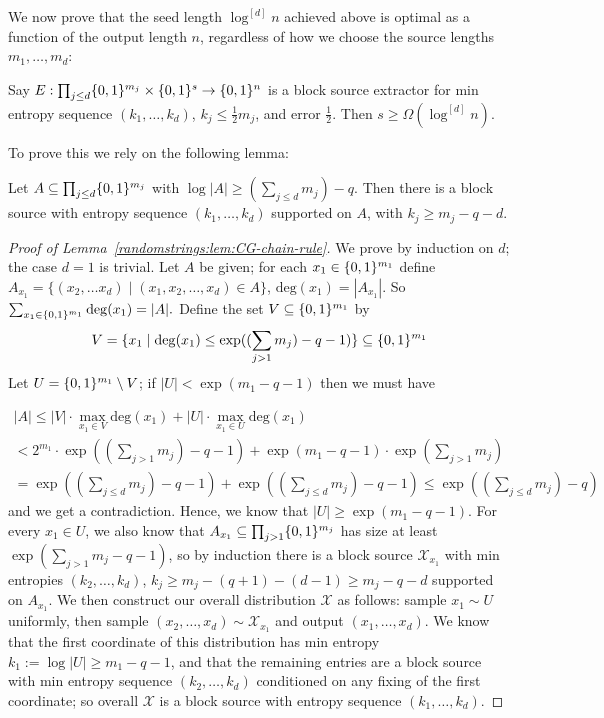 We now prove that the seed length $\log^{[d]}n$ achieved above is optimal as a function of the output length $n$, regardless of how we choose the source lengths $m_1,\ldots,m_d$:
\begin{theorem}\label{randomstrings:thm:seed-length-lb}
Say $E: \prod_{j \leq d} \{0,1\}^{m_j} \times \{0,1\}^s \to \{0,1\}^n$ is a block source extractor for min entropy sequence $(k_1,\ldots,k_d)$, $k_j \leq \frac{1}{2} m_j$, and error $\frac{1}{2}$. Then $s \geq \Omega(\log^{[d]}n)$. 
\end{theorem}

To prove this we rely on the following lemma:
\begin{lemma}\label{randomstrings:lem:CG-chain-rule}
Let $A \subseteq \prod_{j \leq d} \{0,1\}^{m_j}$ with $\log|A|\geq (\sum_{j\leq d}m_j) - q$. Then there is a block source with entropy sequence $(k_1,\ldots,k_d)$ supported on $A$, with $k_j \geq m_j - q - d$.
\end{lemma}
\begin{proof}[Proof of Lemma~\ref{randomstrings:lem:CG-chain-rule}]
We prove by induction on $d$; the case $d=1$ is trivial. Let $A$ be given; for each $x_1 \in \{0,1\}^{m_1}$ define $A_{x_1} = \{(x_2,\ldots x_d) \mid (x_1,x_2,\ldots,x_d) \in A\}$, $\mathrm{deg}(x_1) = |A_{x_1}| $. So $\sum_{x_1 \in \{0,1\}^{m_1}} \deg(x_1) = |A|.$
Define the set $V \subseteq \{0,1\}^{m_1}$ by 
\[
V = \{x_1 \mid \mathrm{deg}(x_1) \leq  \exp((\sum_{j>1} m_j) - q- 1) \} \subseteq \{0,1\}^{m_1}
\]
Let $U = \{0,1\}^{m_1} \setminus V$; if $|U| < \exp( m_1-q-1)$ then we must have

\begin{gather}
|A| \leq |V| \cdot \max_{x_1 \in V} \mathrm{deg}(x_1) + |U| \cdot \max_{x_1 \in U} \mathrm{deg}(x_1) \\
<  2^{m_1} \cdot \exp((\sum_{j>1} m_j) - q-1) + \exp(m_1-q-1) \cdot  \exp(\sum_{j > 1} m_j)\\
= \exp((\sum_{j \leq d}
 m_j) - q-1) + \exp((\sum_{j \leq d} m_j) - q-1) \leq \exp((\sum_{j \leq d} m_j)- q)
 \end{gather}
and we get a contradiction. Hence, we know that $|U| \geq \exp(m_1 - q - 1)$. For every $x_1 \in U$, we also know that $A_{x_1} \subseteq \prod_{j > 1} \{0,1\}^{m_j}$ has size at least $\exp(\sum_{j>1} m_j - q-1)$, so by induction there is a block source $\mathcal{X}_{x_1}$ with min entropies $(k_2,\ldots,k_d)$, $k_j \geq m_j - (q+1) - (d-1) \geq m_j - q - d $ supported on $A_{x_1}$. We then construct our overall distribution $\mathcal{X}$ as follows: sample $x_1 \sim U$ uniformly, then sample $(x_2,\ldots,x_d) \sim \mathcal{X}_{x_1}$ and output $(x_1,\ldots,x_d)$. We know that the first coordinate of this distribution has min entropy $k_1:=\log |U| \geq  m_1 - q - 1 $, and that the remaining entries are a block source with min entropy sequence $(k_2,\ldots,k_d)$ conditioned on any fixing of the first coordinate; so overall $\mathcal{X}$ is a block source with entropy sequence $(k_1,\ldots,k_d)$. 
\end{proof}

